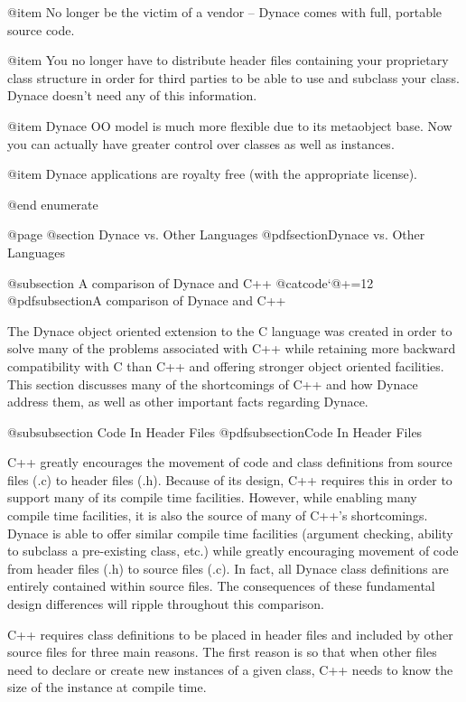 @item
No longer be the victim of a vendor -- Dynace comes with full, portable
source code.

@item
You no longer have to distribute header files containing your proprietary
class structure in order for third parties to be able to use and
subclass your class.  Dynace doesn't need any of this information.

@item
Dynace OO model is much more flexible due to its metaobject base.  Now
you can actually have greater control over classes as well as instances.

@item
Dynace applications are royalty free (with the appropriate license).

@end enumerate


@page
@section Dynace vs. Other Languages
@pdfsection{Dynace vs. Other Languages}

@subsection A comparison of Dynace and C++
{@catcode`@+=12 @pdfsubsection{A comparison of Dynace and C++}}

The Dynace object oriented extension to the C language was created in
order to solve many of the problems associated with C++ while retaining
more backward compatibility with C than C++ and offering stronger object
oriented facilities.  This section discusses many of the shortcomings
of C++ and how Dynace address them, as well as other important facts
regarding Dynace.

@subsubsection Code In Header Files
@pdfsubsection{Code In Header Files}

C++ greatly encourages the movement of code and class definitions from
source files (.c) to header files (.h).  Because of its design, C++
requires this in order to support many of its compile time facilities.
However, while enabling many compile time facilities, it is also the
source of many of C++'s shortcomings.  Dynace is able to offer similar
compile time facilities (argument checking, ability to subclass a
pre-existing class, etc.) while greatly encouraging movement of code
from header files (.h) to source files (.c).  In fact, all Dynace
class definitions are entirely contained within source files.  The
consequences of these fundamental design differences will ripple
throughout this comparison.

C++ requires class definitions to be placed in header files and
included by other source files for three main reasons.  The first reason
is so that when other files need to declare or create new instances of
a given class, C++ needs to know the size of the instance at compile
time.

